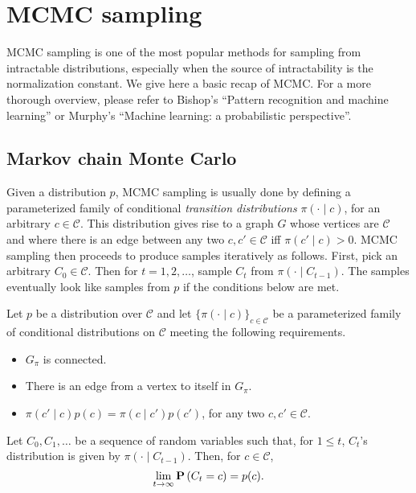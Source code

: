 \section{MCMC sampling}
\label{sec:mcmc}

MCMC sampling is one of the most popular methods for sampling from
intractable distributions, especially when the source of intractability is the
normalization constant. We give here a basic recap of MCMC. For a more
thorough overview, please refer to Bishop's ``Pattern recognition and machine
learning'' or Murphy's ``Machine learning: a probabilistic perspective''.

\subsection{Markov chain Monte Carlo}

Given a distribution $p$, MCMC sampling is usually done by defining a
parameterized family of conditional \emph{transition distributions} $\pi(\cdot \mid c)$, for an
arbitrary $c \in \mathcal{C}$. This distribution gives rise to a graph $G$ whose vertices
are $\mathcal{C}$ and where there is an edge between any two $c, c' \in \mathcal{C}$ iff $\pi(c' \mid c) > 0$.
MCMC sampling then proceeds to produce samples iteratively as follows.
First, pick an arbitrary $C_0 \in \mathcal{C}$. Then for $t = 1, 2, \ldots$, sample $C_t$ from $\pi\left(\cdot \mid C_{t-1}\right)$. The samples eventually look like samples from $p$ if the conditions
below are met.

\begin{theorem}
Let $p$ be a distribution over $\mathcal{C}$ and let $\{\pi(\cdot \mid c)\}_{c \in \mathcal{C}}$ be a parameterized
family of conditional distributions on $\mathcal{C}$ meeting the following
requirements.

\begin{itemize}
\item $G_\pi$ is connected.
\item There is an edge from a vertex to itself in $G_\pi$.
\item $\pi(c' \mid c)p(c) = \pi(c \mid c')p(c')$, for any two $c, c' \in \mathcal{C}$.
\end{itemize}

Let $C_0, C_1, \ldots$ be a sequence of random variables such that, for $1 \leq t$,
$C_t$'s distribution is given by $\pi(\cdot \mid C_{t-1})$. Then, for $c \in \mathcal{C}$,
%
\begin{equation}
\lim_{t \to \infty} \mathbf{P}\left(C_t = c\right) = p(c).
\end{equation}
%
\label{thm:convergence_markov}
\end{theorem}

